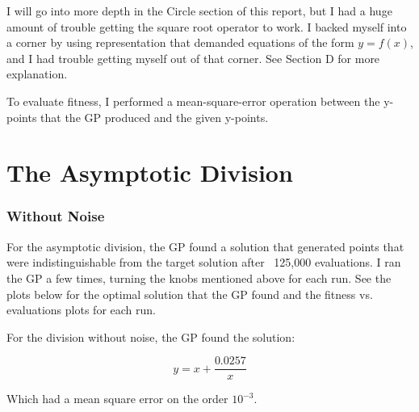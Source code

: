 \documentclass[11pt,amsmath,amssymb]{revtex4}
\begin{document}
I will go into more depth in the Circle section of this report, but I had a huge amount of trouble getting the square root operator to work. I backed myself into a corner by using representation that demanded equations of the form $y=f(x)$, and I had trouble getting myself out of that corner. See Section D for more explanation.

To evaluate fitness, I performed a mean-square-error operation between the y-points that the GP produced and the given y-points.

\section{The Asymptotic Division}
\subsubsection{Without Noise}
For the asymptotic division, the GP found a solution that generated points that were indistinguishable from the target solution after ~125,000 evaluations. I ran the GP a few times, turning the knobs mentioned above for each run. See the plots below for the optimal solution that the GP found and the fitness vs. evaluations plots for each run.

For the division without noise, the GP found the solution:

\begin{equation}
y = x+\frac{0.0257}{x}
\end{equation}

Which had a mean square error on the order $10^{-3}$.
\end{document}
